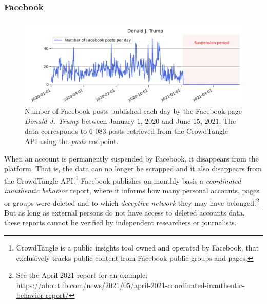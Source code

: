 \documentclass{article}
\begin{document}
\subsubsection{Facebook}

\begin{figure}
	\centering
			\includegraphics[scale=0.3]{./img/fb/fig1_fb.png}
	\caption{Number of Facebook posts published each day by the Facebook page {\it Donald J. Trump} between January $1$, $2020$ and June $15$, $2021$. The data corresponds to $6$ $083$ posts retrieved from the CrowdTangle API using the {\it posts} endpoint.}
	\label{fig1_fb}
\end{figure}

When an account is permanently suspended by Facebook, it disappears from the platform. That is,  the data can no longer be scrapped and it also disappears from the CrowdTangle API.\footnote{CrowdTangle is a public insights tool owned and operated by Facebook, that exclusively tracks public content from Facebook public groups and pages.} Facebook publishes on monthly basis a {\it coordinated inauthentic behavior} report, where it informs how many personal accounts, pages or groups were deleted and to which {\it deceptive network} they may have belonged.\footnote{See the April 2021 report for an example: \href{https://about.fb.com/news/2021/05/april-2021-coordinated-inauthentic-behavior-report/}{https://about.fb.com/news/2021/05/april-2021-coordinated-inauthentic-behavior-report/}} But as long as external persons do not have access to deleted accounts data, these reports cannot be verified by independent researchers or journalists.
\end{document}
